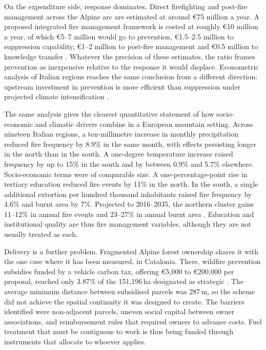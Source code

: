 \documentclass[11pt,a4paper]{article}
\begin{document}
On the expenditure side, response dominates. Direct firefighting and post-fire management across the Alpine arc are estimated at around €75 million a year. A proposed integrated fire management framework is costed at roughly €10 million a year, of which €5--7 million would go to prevention, €1.5--2.5 million to suppression capability, €1--2 million to post-fire management and €0.5 million to knowledge transfer \citep{muller_forest_2020}. Whatever the precision of these estimates, the ratio frames prevention as inexpensive relative to the response it would displace. Econometric analysis of Italian regions reaches the same conclusion from a different direction: upstream investment in prevention is more efficient than suppression under projected climate intensification \citep{michetti_forest_2019}.

The same analysis gives the clearest quantitative statement of how socio-economic and climatic drivers combine in a European mountain setting. Across nineteen Italian regions, a ten-millimetre increase in monthly precipitation reduced fire frequency by 8.9\% in the same month, with effects persisting longer in the north than in the south. A one-degree temperature increase raised frequency by up to 15\% in the south and by between 0.9\% and 5.7\% elsewhere. Socio-economic terms were of comparable size. A one-percentage-point rise in tertiary education reduced fire events by 11\% in the north. In the south, a single additional extortion per hundred thousand inhabitants raised fire frequency by 4.6\% and burnt area by 7\%. Projected to 2016--2035, the northern cluster gains 11--12\% in annual fire events and 23--27\% in annual burnt area \citep{michetti_forest_2019}. Education and institutional quality are thus fire management variables, although they are not usually treated as such.

Delivery is a further problem. Fragmented Alpine forest ownership shares it with the one case where it has been measured, in Catalonia. There, wildfire prevention subsidies funded by a vehicle carbon tax, offering €5{,}000 to €200{,}000 per proposal, reached only 3.87\% of the 151{,}196\,ha designated as strategic \citep{gorrizmifsud_current_2026}. The average minimum distance between subsidised parcels was 287\,m, so the scheme did not achieve the spatial continuity it was designed to create. The barriers identified were non-adjacent parcels, uneven social capital between owner associations, and reimbursement rules that required owners to advance costs. Fuel treatment that must be contiguous to work is thus being funded through instruments that allocate to whoever applies.
\end{document}
